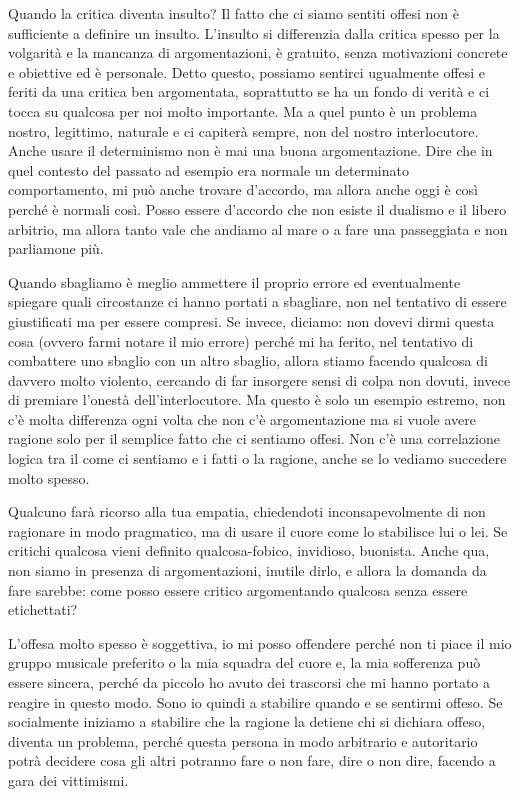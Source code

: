 \documentclass[12pt]{book} %
\begin{document}
Quando la critica diventa insulto? Il fatto che ci siamo sentiti offesi non è sufficiente a definire un insulto.
L'insulto si differenzia dalla critica spesso per la volgarità e la mancanza di argomentazioni, è
gratuito, senza motivazioni concrete e obiettive ed è personale. Detto questo, possiamo sentirci ugualmente offesi e feriti da una
critica ben argomentata, soprattutto se ha un fondo di verità e ci tocca su qualcosa per noi molto importante. Ma a quel
punto è un problema nostro, legittimo, naturale e ci capiterà sempre, non del nostro interlocutore. 
Anche usare il determinismo non è mai una buona argomentazione. Dire che in quel contesto del passato ad esempio era normale un determinato comportamento, mi può anche trovare d'accordo, ma allora anche oggi è così perché è normali così. Posso essere d'accordo che non esiste il dualismo e il libero arbitrio, ma allora tanto vale che andiamo al mare o a fare una passeggiata e non parliamone più.

Quando sbagliamo è meglio ammettere il proprio errore ed eventualmente spiegare quali circostanze
ci hanno portati a sbagliare, non nel tentativo di essere giustificati ma per essere compresi. Se
invece, diciamo: non dovevi dirmi questa cosa (ovvero farmi notare il mio errore) perché
mi ha ferito, nel tentativo di combattere uno sbaglio con un altro sbaglio, allora stiamo facendo qualcosa di davvero
molto violento, cercando di far insorgere sensi di colpa non dovuti, invece di premiare l'onestà
dell'interlocutore. Ma questo è solo un esempio estremo, non c'è molta differenza ogni volta
che non c'è argomentazione ma si vuole avere ragione solo per il semplice fatto che ci sentiamo
offesi. Non c'è una correlazione logica tra il come ci sentiamo e i fatti o la ragione, anche se
lo vediamo succedere molto spesso.

Qualcuno farà ricorso alla tua empatia, chiedendoti inconsapevolmente di non ragionare in modo pragmatico, ma di usare il cuore come lo stabilisce lui o lei. Se critichi qualcosa vieni definito qualcosa-fobico, invidioso, buonista. Anche qua, non siamo in presenza di argomentazioni, inutile dirlo, e allora la domanda da fare sarebbe: come posso essere critico argomentando qualcosa senza essere etichettati?

L'offesa molto spesso è soggettiva, io mi posso offendere perché non ti piace il mio gruppo musicale preferito o la mia
squadra del cuore e, la mia sofferenza può essere sincera, perché da piccolo ho avuto dei trascorsi che mi hanno
portato a reagire in questo modo. Sono io quindi a stabilire quando e se sentirmi offeso. Se socialmente iniziamo a
stabilire che la ragione la detiene chi si dichiara offeso, diventa un problema, perché questa persona in modo
arbitrario e autoritario potrà decidere cosa gli altri potranno fare o non fare, dire o non dire, facendo a gara dei
vittimismi.
\end{document}
